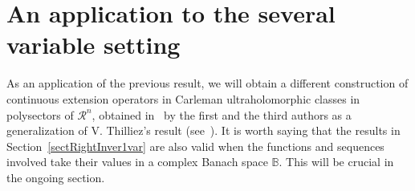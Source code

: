 \documentclass[11pt,a4paper,leqno]{article}
\theoremstyle{plain}
\theoremstyle{definition}
\begin{document}
\section{An application to the several variable setting}\label{seccSeverVaria}

As an application of the previous result, we will obtain a different construction of continuous extension operators in Carleman ultraholomorphic classes in polysectors of $\mathcal{R}^n$, obtained in~\cite{lastrasanz} by the first and the third authors as a generalization of V. Thilliez's result (see~\cite[Thm.\ 3.2.1]{thilliez}).
It is worth saying that the results in Section~\ref{sectRightInver1var} are also valid when the functions and sequences involved take their values in a complex Banach space $\mathbb{B}$. This will be crucial in the ongoing section.
\end{document}
